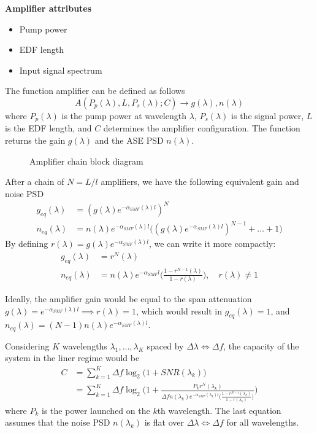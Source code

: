 \documentclass[a4paper]{article}
\begin{document}
\noindent\textbf{Amplifier attributes}
\begin{itemize}
	\item Pump power
	\item EDF length
	\item Input signal spectrum
\end{itemize}

The function amplifier can be defined as follows
\begin{equation}
	A(P_p(\lambda), L, P_s(\lambda); C) \to g(\lambda), n(\lambda)
\end{equation}
where $P_p(\lambda)$ is the pump power at wavelength $\lambda$,  $P_s(\lambda)$ is the signal power, $L$ is the EDF length, and $C$ determines the amplifier configuration. The function returns the gain $g(\lambda)$ and the ASE PSD $n(\lambda)$.

\begin{figure}
	\resizebox{\textwidth}{!}{}
	\caption{Amplifier chain block diagram}
\end{figure}

After a chain of $N = L/l$ amplifiers, we have the following equivalent gain and noise PSD
\begin{align}
	g_{eq}(\lambda) &= (g(\lambda)e^{-\alpha_{SMF}(\lambda)l})^N \\
	n_{eq}(\lambda) &= n(\lambda)e^{-\alpha_{SMF}(\lambda)l}\Big((g(\lambda)e^{-\alpha_{SMF}(\lambda)l})^{N-1}+\ldots+1\Big)
\end{align}
By defining $r(\lambda) = g(\lambda)e^{-\alpha_{SMF}(\lambda)l}$, we can write it more compactly:
\begin{align}
g_{eq}(\lambda) &= r^N(\lambda) \\
n_{eq}(\lambda) &= n(\lambda)e^{-\alpha_{SMF}l}\Big(\frac{1-r^{N-1}(\lambda)}{1-r(\lambda)}\Big), \quad r(\lambda)\neq 1
\end{align}

Ideally, the amplifier gain would be equal to the span attenuation $g(\lambda) = e^{-\alpha_{SMF}(\lambda)l}\implies r(\lambda)=1$, which would result in $g_{eq}(\lambda) = 1$, and $n_{eq}(\lambda) = (N-1)n(\lambda)e^{-\alpha_{SMF}(\lambda)l}$.

Considering $K$ wavelengths $\lambda_1, \ldots, \lambda_{K}$ spaced by $\Delta\lambda\Longleftrightarrow\Delta f$, the capacity of the system in the liner regime would be
\begin{align}
	C &= \sum_{k = 1}^{K} \Delta f\log_2\Big(1 + SNR(\lambda_k)\Big)\\
	&= \sum_{k = 1}^{K} \Delta f\log_2\Bigg(1 + \frac{P_kr^N(\lambda_k)}{\Delta fn(\lambda_k)e^{-\alpha_{SMF}(\lambda_k)l}\Big(\frac{1-r^{N-1}(\lambda_k)}{1-r(\lambda_k)}\Big)}\Bigg) \label{eq:capacity}
\end{align}
where $P_k$ is the power launched on the $k$th wavelength. The last equation assumes that the noise PSD $n(\lambda_k)$ is flat over $\Delta\lambda\Longleftrightarrow\Delta f$ for all wavelengths.
\end{document}
